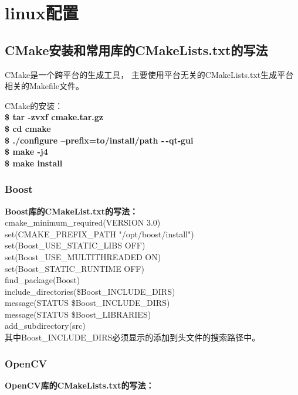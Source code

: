 \chapter{linux配置}

\section{CMake安装和常用库的CMakeLists.txt的写法}
CMake是一个跨平台的生成工具，%
主要使用平台无关的CMakeLists.txt生成平台相关的Makefile文件。%

CMake的安装：\\
\noindent\textbf{\color{magenta}\$ tar -zvxf cmake.tar.gz}\\
\noindent\textbf{\color{magenta}\$ cd cmake}\\
\noindent\textbf{\color{magenta}\$ ./configure --prefix=to/install/path -\,-qt-gui}\\
\noindent\textbf{\color{magenta}\$ make -j4}\\
\noindent\textbf{\color{magenta}\$ make install}\\

\subsection{Boost}
\noindent\textbf{\color{magenta}Boost库的CMakeList.txt的写法：}\\
cmake\_minimum\_required(VERSION 3.0)\\

\noindent{}set(CMAKE\_PREFIX\_PATH "/opt/boost/install")\\
set(Boost\_USE\_STATIC\_LIBS OFF)\\
set(Boost\_USE\_MULTITHREADED ON)\\
set(Boost\_STATIC\_RUNTIME OFF)\\

\noindent{}find\_package(Boost)\\
include\_directories(\${Boost\_INCLUDE\_DIRS})\\

\noindent{}message(STATUS \${Boost\_INCLUDE\_DIRS})\\
message(STATUS \${Boost\_LIBRARIES})\\

\noindent{}add\_subdirectory(src)\\
其中Boost\_INCLUDE\_DIRS必须显示的添加到头文件的搜索路径中。

\subsection{OpenCV}
\noindent\textbf{\color{magenta}OpenCV库的CMakeLists.txt的写法：}

